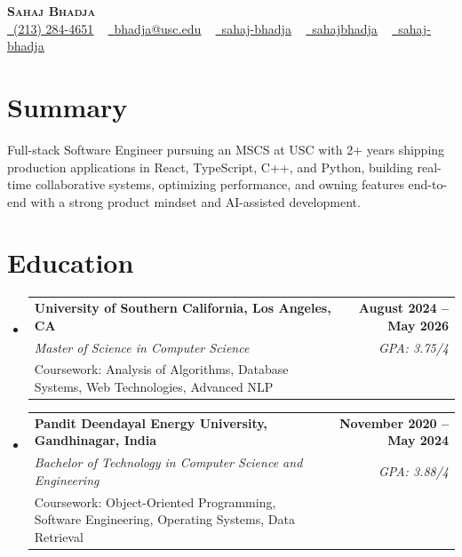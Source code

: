 \documentclass[letterpaper,10pt]{article}
\makeatletter
\newcommand{\resumeEduSubheading}[5]{\vspace{-1pt}\item\begin{tabular*}{1.0\textwidth}[t]{l@{\extracolsep{\fill}}r}\textbf{#1} & \textbf{\small #2} \\\textit{\small #3} & \textit{\small #4} \\\small #5 & \\\end{tabular*}\vspace{-4pt}}
\newcommand{\resumeSubHeadingListStart}{\begin{itemize}[leftmargin=0.0in, label={}]}
\newcommand{\resumeSubHeadingListEnd}{\end{itemize}}
\makeatother
\begin{document}
\begin{center}
{\Huge \scshape \textbf{Sahaj Bhadja}} \\ \vspace{1pt}
\small \href{tel:(213) 284-4651}{\faPhone\ \underline{(213) 284-4651}} ~ \href{mailto: bhadja@usc.edu}{\raisebox{-0.2\height}\faEnvelope\ \underline{bhadja@usc.edu}} ~
\href{https://www.linkedin.com/in/sahaj-bhadja/}{\raisebox{-0.2\height}\faLinkedin\ \underline{sahaj-bhadja}} ~ \href{https://github.com/SAHAJ-BHADJA}{\raisebox{-0.2\height}\faGithub\ \underline{sahajbhadja}} ~
\href{https://sahaj-bhadja.vercel.app/}{\raisebox{-0.2\height}\faGlobe\ \underline{sahaj-bhadja}}
\end{center}
\vspace{-16pt}
\section{Summary}
\begin{itemize}[leftmargin=0.15in, label={}]
\small{\item{Full-stack Software Engineer pursuing an MSCS at USC with 2+ years shipping production applications in React, TypeScript, C++, and Python, building real-time collaborative systems, optimizing performance, and owning features end-to-end with a strong product mindset and AI-assisted development.}}
\end{itemize}
\vspace{-6pt}
\section{Education}
\resumeSubHeadingListStart
\resumeEduSubheading{University of Southern California, Los Angeles, CA}{August 2024 -- May 2026}{Master of Science in Computer Science}{GPA: 3.75/4}{Coursework: Analysis of Algorithms, Database Systems, Web Technologies, Advanced NLP}
\vspace{-9pt}
\resumeEduSubheading{Pandit Deendayal Energy University, Gandhinagar, India}{November 2020 -- May 2024}{Bachelor of Technology in Computer Science and Engineering}{GPA: 3.88/4}{Coursework: Object-Oriented Programming, Software Engineering, Operating Systems, Data Retrieval}
\resumeSubHeadingListEnd
\vspace{-6pt}
\end{document}
